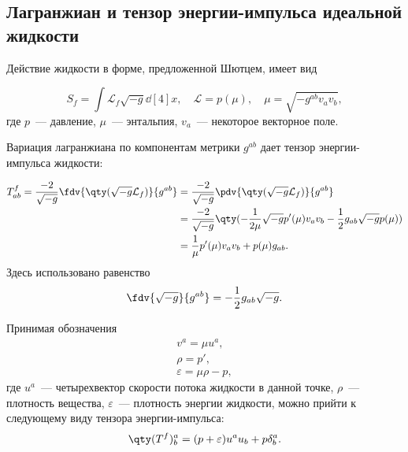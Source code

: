 \documentclass[\docroot/reports/draft/report.tex]{subfiles}
\begin{document}
\onlyinsubfile{\tableofcontents}

\subsection{Лагранжиан и тензор энергии-импульса идеальной жидкости}

    Действие жидкости в форме, предложенной Шютцем, имеет вид

    \begin{equation}
        S_f = \int \mathcal{L}_f \sqrt{-g} \dd[4]{x} , \quad
        \mathcal{L} = p(\mu) , \quad
        \mu = \sqrt{-g^{ab} v_a v_b} ,
    \end{equation}
    где $p$~--- давление, $\mu$~--- энтальпия, $v_a$~--- некоторое векторное поле.

    Вариация лагранжиана по компонентам метрики $g^{ab}$ дает тензор энергии-импульса жидкости:

    \begin{equation}\begin{aligned}
        T^f_{ab} = \frac{-2}{\sqrt{-g}} \fdv{\qty(\sqrt{-g} \mathcal{L}_f)}{g^{ab}} &=
            \frac{-2}{\sqrt{-g}} \pdv{\qty(\sqrt{-g} \mathcal{L}_f)}{g^{ab}} \\ &=
            \frac{-2}{\sqrt{-g}} \qty(
                - \frac{1}{2 \mu} \sqrt{-g} p'(\mu) v_a v_b - \frac{1}{2} g_{ab} \sqrt{-g} p(\mu)
            ) \\ &=
            \frac{1}{\mu} p'(\mu) v_a v_b + p(\mu) g_{ab} .
    \end{aligned}\end{equation}
    Здесь использовано равенство
    \begin{equation*}
        \fdv{\sqrt{-g}}{g^{ab}} = - \frac{1}{2} g_{ab} \sqrt{-g} .
    \end{equation*}

    Принимая обозначения
    \begin{equation*}\begin{gathered}
        v^a = \mu u^a , \\
        \rho = p' , \\
        \varepsilon = \mu \rho - p ,
    \end{gathered}\end{equation*}
    где $u^a$~--- четырехвектор скорости потока жидкости в данной точке, $\rho$~--- плотность вещества, $\varepsilon$~--- плотность энергии жидкости, можно прийти к следующему виду тензора энергии-импульса:
    \begin{equation}
        \qty(T^f)^a_b = (p + \varepsilon) u^a u_b + p \delta^a_b .
    \end{equation}
\end{document}
